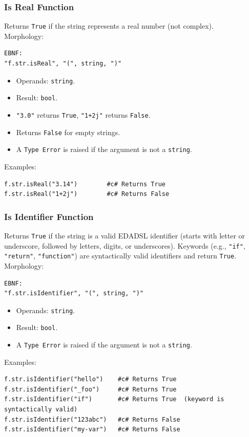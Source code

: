 \subsubsection{Is Real Function}
Returns \texttt{True} if the string represents a real number (not complex). \\
Morphology:
\begin{verbatim}
EBNF:
"f.str.isReal", "(", string, ")"
\end{verbatim}
\begin{itemize}
\item Operands: \texttt{string}.
\item Result: \texttt{bool}.
\item \texttt{"3.0"} returns \texttt{True}, \texttt{"1+2j"} returns \texttt{False}.
\item Returns \texttt{False} for empty strings.
\item A \texttt{Type Error} is raised if the argument is not a \texttt{string}.
\end{itemize}
Examples:
\begin{verbatim}
f.str.isReal("3.14")        #c# Returns True
f.str.isReal("1+2j")        #c# Returns False
\end{verbatim}

\subsubsection{Is Identifier Function}
Returns \texttt{True} if the string is a valid EDADSL identifier (starts with letter or underscore, followed by letters, digits, or underscores). Keywords (e.g., \texttt{"if"}, \texttt{"return"}, \texttt{"function"}) are syntactically valid identifiers and return \texttt{True}. \\
Morphology:
\begin{verbatim}
EBNF:
"f.str.isIdentifier", "(", string, ")"
\end{verbatim}
\begin{itemize}
\item Operands: \texttt{string}.
\item Result: \texttt{bool}.
\item A \texttt{Type Error} is raised if the argument is not a \texttt{string}.
\end{itemize}
Examples:
\begin{verbatim}
f.str.isIdentifier("hello")    #c# Returns True
f.str.isIdentifier("_foo")     #c# Returns True
f.str.isIdentifier("if")       #c# Returns True  (keyword is syntactically valid)
f.str.isIdentifier("123abc")   #c# Returns False
f.str.isIdentifier("my-var")   #c# Returns False
\end{verbatim}

